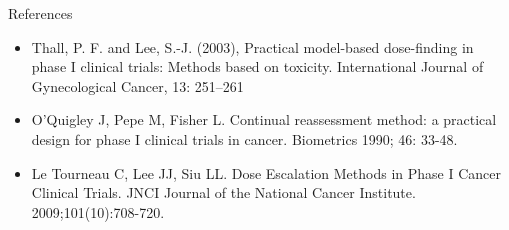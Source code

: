 \documentclass{beamer}
\begin{document}
\begin{frame}{References}

\begin{itemize}
\item Thall, P. F. and Lee, S.-J. (2003), Practical model-based dose-finding in phase I clinical trials: Methods based on toxicity. International Journal of Gynecological Cancer, 13: 251–261

\item
  O'Quigley J, Pepe M, Fisher L. Continual reassessment method: a
  practical design for phase I clinical trials in cancer. Biometrics
  1990; 46: 33-48.
  
  \item
  Le Tourneau C, Lee JJ, Siu LL. Dose Escalation Methods in Phase I Cancer Clinical Trials. JNCI Journal of the National Cancer Institute. 2009;101(10):708-720. 
  
  \end{itemize}
\end{frame}
\end{document}
